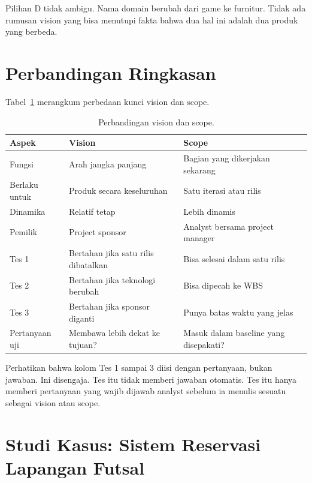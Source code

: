 \documentclass[11pt,a4paper]{article}
\begin{document}
Pilihan D tidak ambigu. Nama domain berubah dari game ke furnitur. Tidak ada rumusan vision yang bisa menutupi fakta bahwa dua hal ini adalah dua produk yang berbeda.

\section{Perbandingan Ringkasan}

Tabel~\ref{tab:summary} merangkum perbedaan kunci vision dan scope.

\begin{table}[H]
	\centering
	\caption{Perbandingan vision dan scope.}
	\label{tab:summary}
	\footnotesize
	\begin{tabularx}{\textwidth}{l X X}
		\toprule
		Aspek          & Vision                              & Scope                                 \\
		\midrule
		Fungsi         & Arah jangka panjang                 & Bagian yang dikerjakan sekarang       \\
		Berlaku untuk  & Produk secara keseluruhan           & Satu iterasi atau rilis               \\
		Dinamika       & Relatif tetap                       & Lebih dinamis                         \\
		Pemilik        & Project sponsor                     & Analyst bersama project manager       \\
		Tes 1          & Bertahan jika satu rilis dibatalkan & Bisa selesai dalam satu rilis         \\
		Tes 2          & Bertahan jika teknologi berubah     & Bisa dipecah ke WBS                   \\
		Tes 3          & Bertahan jika sponsor diganti       & Punya batas waktu yang jelas          \\
		Pertanyaan uji & Membawa lebih dekat ke tujuan?      & Masuk dalam baseline yang disepakati? \\
		\bottomrule
	\end{tabularx}
\end{table}

Perhatikan bahwa kolom Tes 1 sampai 3 diisi dengan pertanyaan, bukan jawaban. Ini disengaja. Tes itu tidak memberi jawaban otomatis. Tes itu hanya memberi pertanyaan yang wajib dijawab analyst sebelum ia menulis sesuatu sebagai vision atau scope.

\section{Studi Kasus: Sistem Reservasi Lapangan Futsal}
\end{document}

